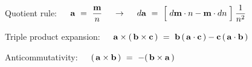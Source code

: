 \documentclass[10pt,fleqn]{article}
\begin{document}
\par \vspace{+1.20em}

\par {}

\bigskip \medskip

\noindent Quotient rule:
$
\hspace{+1.20em} \mathbf{a} ~=~ \dfrac{\mathbf{m}}{n} \hspace{+1.29em} \rightarrow \hspace{+1.29em} d\mathbf{a} ~=~ \Big [ \; d\mathbf{m} \cdot n - \mathbf{m} \cdot dn \; \Big ] \: \dfrac{1}{n^2}
$

\par \vspace{+2.40em}

\noindent Triple product expansion:
$
\hspace{+1.20em} \mathbf{a} \times ( \, \mathbf{b} \times \mathbf{c} \, ) ~=~ \mathbf{b} \, ( \, \mathbf{a} \cdot \mathbf{c} \, ) - \mathbf{c} \, ( \, \mathbf{a} \cdot \mathbf{b} \, )
$

\par \vspace{+2.61em}

\noindent Anticommutativity:
$
\hspace{+1.20em} ( \, \mathbf{a} \times \mathbf{b} \, ) ~=~ - ( \, \mathbf{b} \times \mathbf{a} \, )
$
\end{document}
